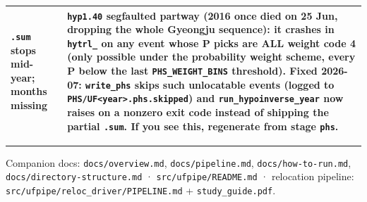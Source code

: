 \documentclass[11pt]{article}
\newcommand{\code}[1]{\texttt{#1}}
\begin{document}
\begin{center}
\begin{tabular}{@{}>{\raggedright\arraybackslash}p{6.0cm}>{\raggedright\arraybackslash}p{8.5cm}@{}}
\code{.sum} stops mid-year; months missing & \code{hyp1.40} \textbf{segfaulted} partway (2016 once died on 25 Jun, dropping the whole Gyeongju sequence): it crashes in \code{hytrl\_} on any event whose P picks are ALL weight code 4 (only possible under the probability weight scheme, every P below the last \code{PHS\_WEIGHT\_BINS} threshold). Fixed 2026-07: \code{write\_phs} skips such unlocatable events (logged to \code{PHS/UF<year>.phs.skipped}) and \code{run\_hypoinverse\_year} now raises on a nonzero exit code instead of shipping the partial \code{.sum}. If you see this, regenerate from stage \code{phs}. \\
\bottomrule
\end{tabular}
\end{center}

\vspace{2mm}\hrule\vspace{2mm}
{\small\color{soft} Companion docs: \code{docs/overview.md}, \code{docs/pipeline.md}, \code{docs/how-to-run.md},
\code{docs/directory-structure.md} · \code{src/ufpipe/README.md} · relocation pipeline:
\code{src/ufpipe/reloc\_driver/PIPELINE.md} + \code{study\_guide.pdf}.}
\end{document}
